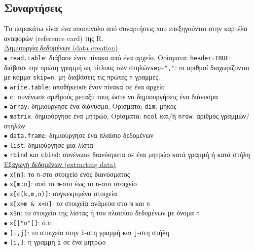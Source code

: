 \documentclass[a4paper,10pt,twocolumn]{article}
\begin{document}
\subsection{Συναρτήσεις}

Το παρακάτω είναι ένα υποσύνολο από συναρτήσεις που επεξηγούνται στην καρτέλα αναφορών (reference card) της R.\\

\noindent \underline{Δημιουργία δεδομένων (data creation)}\vspace{0.2cm}\\
$\bullet$ \texttt{read.table}: διάβασε έναν πίνακα από ένα αρχείο. Ορίσματα: \texttt{header=TRUE}: διάβασε
την πρώτη γραμμή ως τίτλους των στηλών\anoteleia \texttt{sep=","}: οι αριθμοί διαχωρίζονται με κόμμα\anoteleia
\texttt{skip=n}: μη διαβάσεις τις πρώτες \texttt{n} γραμμές.\\
$\bullet$ \texttt{write.table}: αποθήκευσε έναν πίνακα σε ένα αρχείο\\
$\bullet$ \texttt{c}: συνένωσε αριθμούς μεταξύ τους ώστε να δημιουργήσεις ένα διάνυσμα\\
$\bullet$ \texttt{array}: δημιούργησε ένα διάνυσμα, Ορίσματα: \texttt{dim}: μήκος\\
$\bullet$ \texttt{matrix}: δημιούργησε ένα μητρώο, Ορίσματα: \texttt{ncol} και/ή \texttt{nrow}: αριθμός γραμμών/
στηλών\\
$\bullet$ \texttt{data.frame}: δημιούργησε ένα πλαίσιο δεδομένων\\
$\bullet$ \texttt{list}: δημιούργησε μια λίστα\\
$\bullet$ \texttt{rbind} και \texttt{cbind}: συνένωσε διανύσματα σε ένα μητρώο κατά γραμμή ή κατά στήλη\\

\noindent \underline{Εξαγωγή δεδομένων (extracting data)}\vspace{0.2cm}\\
$\bullet$ \texttt{x[n]}: το \texttt{n}-στο στοιχείο ενός διανύσματος\\
$\bullet$ \texttt{x[m:n]}: από το \texttt{m}-στο έως το \texttt{n}-στο στοιχείο\\
$\bullet$ \texttt{x[c(k,m,n)]}: συγκεκριμένα στοιχεία\\
$\bullet$ \texttt{x[x>m \& x<n]}: τα στοιχεία ανάμεσα στο \texttt{m} και \texttt{n}\\
$\bullet$ \verb!x$n!:  το στοιχείο της λίστας ή του πλαισίου δεδομένων με όνομα \texttt{n}\\
$\bullet$ \texttt{x[["n"]]}: ό.π.\\
$\bullet$ \texttt{[i,j]}: το στοιχείο στην \texttt{i}-στη γραμμή και \texttt{j}-στη στήλη \\
$\bullet$ \texttt{[i,]}: η γραμμή \texttt{i} σε ένα μητρώο\\
\end{document}
